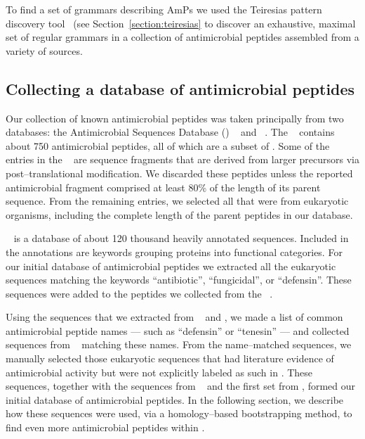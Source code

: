     To find a set of grammars describing AmPs we used the
    Teiresias pattern discovery tool~\cite{rigoutsos1998combinatorial}
    (see Section~\vref{section:teiresias} to discover an
    exhaustive, maximal set of regular grammars in a collection of
    antimicrobial peptides assembled from a variety of sources.

    \subsection{Collecting a database of antimicrobial peptides}

    Our collection of known antimicrobial peptides was taken principally
    from two databases:
    the Antimicrobial Sequences
    Database (\amsdb) ~\cite{tossi2002antimicrobial} and
    \sptr ~\cite{bairoch2000swiss-prot}.
        The \amsdb~ contains
        about 750 antimicrobial peptides, all of which are
        a subset of \sptr .  Some of the entries in
        the \amsdb~ are sequence fragments that are derived
        from larger precursors via post--translational modification.
        We discarded these peptides unless the reported
        antimicrobial fragment comprised at least 80\% of the
        length of its parent sequence.  From the remaining
        entries, we selected all that were from eukaryotic organisms,
        including the complete length of the parent
        peptides in our database.



        

        \sptr~ is a database of about 120 thousand heavily annotated
        sequences.  Included in the  annotations are keywords grouping
        proteins into functional categories.  For our initial database
        of antimicrobial peptides we extracted all the eukaryotic
        sequences matching
        the keywords ``antibiotic'', ``fungicidal'', or ``defensin''.
        These sequences were added to the peptides we collected
        from the ~\amsdb.

        Using the sequences that we extracted from \amsdb~ and \sptr,
        we made a list of
        common antimicrobial peptide names --- such as ``defensin'' or
        ``tenesin'' --- and collected sequences from \sptr~ matching these
        names.  From the name--matched sequences, we manually selected
        those eukaryotic sequences that had literature evidence of
        antimicrobial activity but were not explicitly
        labeled as such in \sptr.  These sequences, together with the
        sequences from \amsdb~ and the first set from \sptr, formed our initial database
        of antimicrobial peptides.  In the following section, we describe
        how these sequences were used, via a homology--based bootstrapping
        method, to find even more antimicrobial peptides within \sptr.

